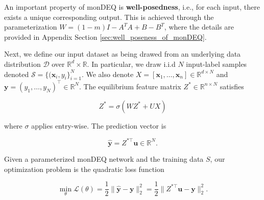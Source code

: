 \documentclass[twoside]{article}
\begin{document}


An important property of monDEQ is \textbf{well-posedness}, i.e., for each input, there exists a unique corresponding output. This is achieved through the parameterization $W=(1-m) I-A^{T} A+B-B^{T}$, where the details are provided in Appendix Section \ref{sec:well_poseness_of_monDEQ}.

Next, we define our input dataset as being drawed from an underlying data distribution $\mathcal{D}$ over $\mathbb{R}^{d} \times \mathbb{R}$. In particular, we draw i.i.d $N$ input-label samples denoted $\mathcal{S} = \{(\mathbf{x}_i, y_{i}\}_{i = 1}^N$. We also denote $X = [\mathbf{x}_1, \dots, \mathbf{x}_n] \in \mathbb{R}^{d \times N}$ and $\mathbf{y} = (y_1, \dots, y_N)^\top \in \mathbb{R}^{N}$. 
The equilibrium feature matrix $Z^* \in \mathbb{R}^{n \times N}$ satisfies

\begin{equation}
Z^* = \sigma(W Z^* + U X)
\label{eq:eq_point}
\end{equation}

where $\sigma$ applies entry-wise. The prediction vector is

$$\hat{\mathbf{y}} = Z^{*\top} \mathbf{u} \in \mathbb{R}^N.$$



Given a parameterized monDEQ network and the training data $S$, our optimization problem is the quadratic loss function

$$\min_\theta \mathcal{L}(\theta) = \frac{1}{2}\|\hat{\mathbf{y}} - \mathbf{y}\|_2^2
= \frac{1}{2}\|Z^{*\top}\mathbf{u} - \mathbf{y}\|_2^2.$$
\end{document}
